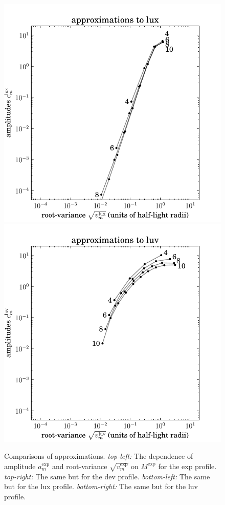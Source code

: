 \documentclass[12pt,pdftex,preprint]{aastex}
\newlength{\figurewidth}
\begin{document}
\begin{figure}
\includegraphics[width=\figurewidth]{mixtures_vs_K_lux}%
\includegraphics[width=\figurewidth]{mixtures_vs_K_luv}
\caption{Comparisons of approximations.  \textsl{top-left:} The
  dependence of amplitude $a^{\exp}_m$ and root-variance
  $\sqrt{v^{\exp}_m}$ on $M^{\exp}$ for the exp profile.
  \textsl{top-right:} The same but for the dev profile.
  \textsl{bottom-left:} The same but for the lux profile.
  \textsl{bottom-right:} The same but for the luv profile.\label{fig:M}}
\end{figure}
\end{document}
